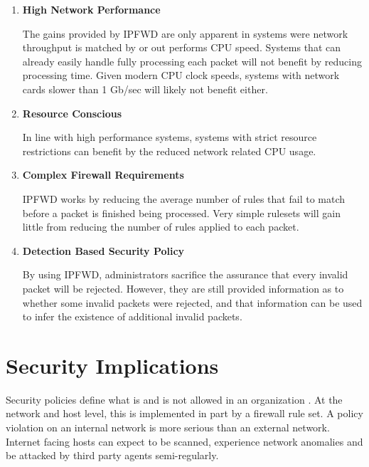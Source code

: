 \documentclass[journal]{IEEEtran}
\begin{document}
    \begin{enumerate}
      \item \textbf{High Network Performance}

        The gains provided by IPFWD are only apparent in systems were network
        throughput is matched by or out performs CPU speed. Systems that can
        already easily handle fully processing each packet will not benefit by
        reducing processing time. Given modern CPU clock speeds, systems with
        network cards slower than 1 Gb/sec will likely not benefit either.

      \item \textbf{Resource Conscious}

        In line with high performance systems, systems with strict resource
        restrictions can benefit by the reduced network related CPU usage.

      \item \textbf{Complex Firewall Requirements}

        IPFWD works by reducing the average number of rules that fail to match
        before a packet is finished being processed. Very simple rulesets will
        gain little from reducing the number of rules applied to each packet.

      \item \textbf{Detection Based Security Policy}

        By using IPFWD, administrators sacrifice the assurance that every
        invalid packet will be rejected.  However, they are still provided
        information as to whether some invalid packets were rejected, and that
        information can be used to infer the existence of additional invalid
        packets. 

    \end{enumerate}


\section{Security Implications}

  Security policies define what is and is not allowed in an organization
  \cite{TODO}. At the network and host level, this is implemented in part by a
  firewall rule set. A policy violation on an internal network is more serious
  than an external network. Internet facing hosts can expect to be scanned,
  experience network anomalies and be attacked by third party agents
  semi-regularly. 
\end{document}
